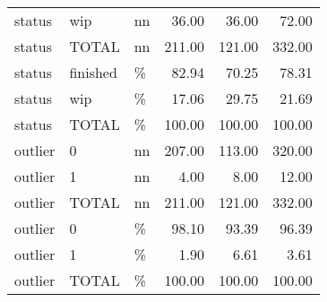 \begin{longtable}[t]{lllrrr}
status & wip & nn & 36.00 & 36.00 & 72.00\\
status & TOTAL & nn & 211.00 & 121.00 & 332.00\\
status & finished & \% & 82.94 & 70.25 & 78.31\\
status & wip & \% & 17.06 & 29.75 & 21.69\\
status & TOTAL & \% & 100.00 & 100.00 & 100.00\\
outlier & 0 & nn & 207.00 & 113.00 & 320.00\\
outlier & 1 & nn & 4.00 & 8.00 & 12.00\\
outlier & TOTAL & nn & 211.00 & 121.00 & 332.00\\
outlier & 0 & \% & 98.10 & 93.39 & 96.39\\
outlier & 1 & \% & 1.90 & 6.61 & 3.61\\
outlier & TOTAL & \% & 100.00 & 100.00 & 100.00\\*
\end{longtable}
\endgroup{}
